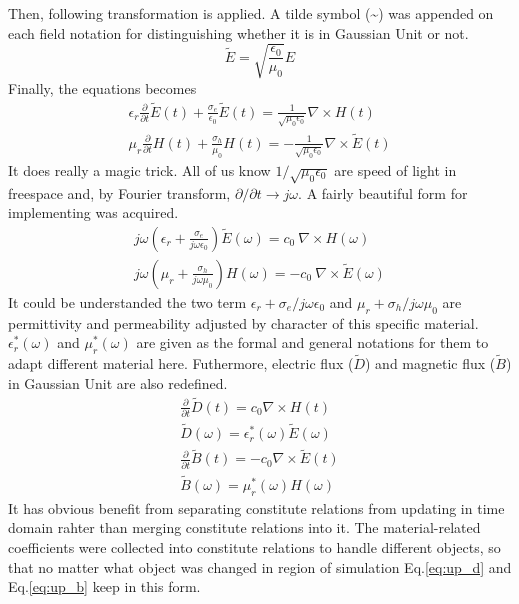 Then, following transformation is applied. A tilde symbol (\textasciitilde{}) was appended on each field notation for
distinguishing whether it is in Gaussian Unit or not.
\label{eq:gaussian_unit}
\begin{equation}
  {\displaystyle\widetilde{E} = \sqrt{\frac{\epsilon_0}{\mu_0}}E}
\end{equation}
Finally, the equations becomes
\begin{gather}
  \epsilon_r\frac{\partial}{\partial t}\widetilde{E}(t) + \frac{\sigma_e}{\epsilon_0}\widetilde{E}(t) = \frac{1}{\sqrt{\mu_0\epsilon_0}}\nabla\times H(t)\\
  \mu_r\frac{\partial}{\partial t} H(t) + \frac{\sigma_h}{\mu_0}H(t) = - \frac{1}{\sqrt{\mu_0\epsilon_0}}\nabla\times\widetilde{E}(t)
\end{gather}
It does really a magic trick. All of us know $1/\sqrt{\mu_0\epsilon_0}$ are speed of light in freespace and, by Fourier
transform, $\partial/\partial t \rightarrow j\omega$. A fairly beautiful form for implementing was acquired.
\begin{gather}
  j\omega\left(\epsilon_r + \frac{\sigma_e}{j\omega\epsilon_0}\right)\widetilde{E}(\omega) = c_0\ \nabla\times H(\omega)\\
  j\omega\left(\mu_r + \frac{\sigma_h}{j\omega\mu_0}\right)H(\omega) = - c_0\ \nabla\times\widetilde{E}(\omega)
\end{gather}
It could be understanded the two term $\epsilon_r + \sigma_e/j\omega\epsilon_0$ and $\mu_r + \sigma_h/j\omega\mu_0$ are
permittivity and permeability adjusted by character of this specific material. $\epsilon_r^*(\omega)$ and
$\mu_r^*(\omega)$ are given as the formal and general notations for them to adapt different material here. Futhermore,
electric flux ($\widetilde{D}$) and magnetic flux ($\widetilde{B}$) in Gaussian Unit are also redefined.
\begin{gather}
  \frac{\partial}{\partial t}\widetilde{D}(t) = c_0\nabla\times H(t)\label{eq:up_d}\\
  \widetilde{D}(\omega) = \epsilon_r^*(\omega)\widetilde{E}(\omega)\label{eq:cr_d}\\
  \frac{\partial}{\partial t}\widetilde{B}(t) = -c_0\nabla\times\widetilde{E}(t)\label{eq:up_b}\\
  \widetilde{B}(\omega) = \mu_r^*(\omega)H(\omega)\label{eq:cr_b}
\end{gather}
It has obvious benefit from separating constitute relations from updating in time domain rahter than merging constitute
relations into it. The material-related coefficients were collected into constitute relations to handle different
objects, so that no matter what object was changed in region of simulation Eq.\ref{eq:up_d} and Eq.\ref{eq:up_b} keep in
this form.

